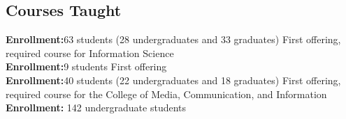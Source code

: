 \documentclass[10pt,letterpaper,final]{moderncv}
\begin{document}
{{{{\subsection{Courses Taught}
{\small {\textcolor{color5}{\textbf{Enrollment:}}}63 students (28 undergraduates and 33 graduates)}\vspace{6pt}
{\small First offering, required course for Information Science\\ {\textcolor{color5}{\textbf{Enrollment:}}}9 students\vspace{6pt}}
{\small First offering\\ {\textcolor{color5}{\textbf{Enrollment:}}}40 students (22 undergraduates and 18 graduates)}\vspace{6pt}
{First offering, required course for the College of Media, Communication, and Information\\{\textcolor{color5}{\textbf{Enrollment:}}} 142 undergraduate students }\vspace{6pt}
}}}}
\end{document}
